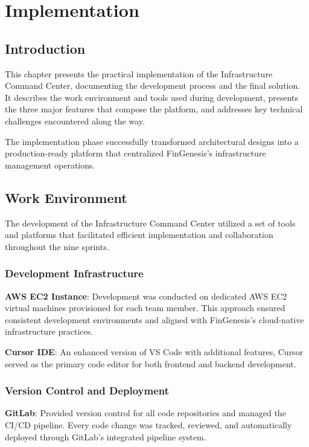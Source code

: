 \chapter{Implementation}

\section{Introduction}

This chapter presents the practical implementation of the Infrastructure Command Center, documenting the development process and the final solution. It describes the work environment and tools used during development, presents the three major features that compose the platform, and addresses key technical challenges encountered along the way.

The implementation phase successfully transformed architectural designs into a production-ready platform that centralized FinGenesis's infrastructure management operations.

\section{Work Environment}

The development of the Infrastructure Command Center utilized a set of tools and platforms that facilitated efficient implementation and collaboration throughout the nine sprints.

\subsection{Development Infrastructure}

\textbf{AWS EC2 Instance}: Development was conducted on dedicated AWS EC2 virtual machines provisioned for each team member. This approach ensured consistent development environments and aligned with FinGenesis's cloud-native infrastructure practices.

\textbf{Cursor IDE}: An enhanced version of VS Code with additional features, Cursor served as the primary code editor for both frontend and backend development.

\subsection{Version Control and Deployment}

\textbf{GitLab}: Provided version control for all code repositories and managed the CI/CD pipeline. Every code change was tracked, reviewed, and automatically deployed through GitLab's integrated pipeline system.

